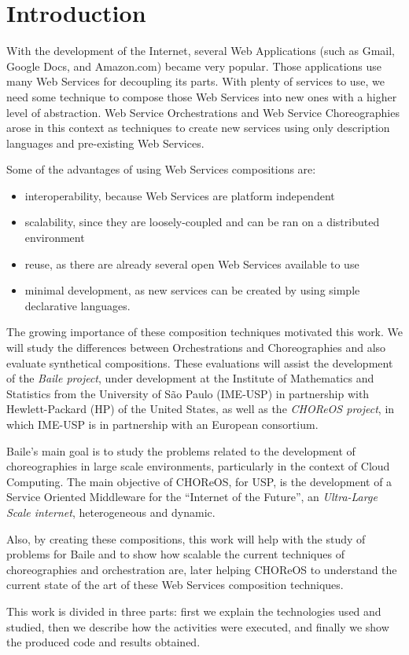\section{Introduction}

With the development of the Internet, several Web Applications (such as Gmail, Google Docs, and Amazon.com) became very popular. Those applications use many Web Services for decoupling its parts. With plenty of services to use, we need some technique to compose those Web Services into new ones with a higher level of abstraction. Web Service Orchestrations and Web Service Choreographies arose in this context as techniques to create new services using only description languages and pre-existing Web Services.

Some of the advantages of using Web Services compositions are:
\begin{itemize}
	\item interoperability, because Web Services are platform independent
	\item scalability, since they are loosely-coupled and can be ran on a distributed environment
	\item reuse, as there are already several open Web Services available to use
	\item minimal development, as new services can be created by using simple declarative languages.
\end{itemize}	

The growing importance of these composition techniques motivated this work. We will study the differences between Orchestrations and Choreographies and also evaluate synthetical compositions. These evaluations will assist the development of the \emph{Baile project}, under development at the Institute of Mathematics and Statistics from the University of São Paulo (IME-USP) in partnership with Hewlett-Packard (HP) of the United States, as well as the \emph{CHOReOS project}, in which IME-USP is in partnership with an European consortium.

Baile’s main goal is to study the problems related to the development of choreographies in large scale environments, particularly in the context of Cloud Computing. The main objective of CHOReOS, for USP, is the development of a Service Oriented Middleware for the ``Internet of the Future'', an \emph{Ultra-Large Scale internet}, heterogeneous and dynamic.

Also, by creating these compositions, this work will help with the study of problems for Baile and to show how scalable the current techniques of choreographies and orchestration are, later helping CHOReOS to understand the current state of the art of these Web Services composition techniques.

This work is divided in three parts: first we explain the technologies used and studied, then we describe how the activities were executed, and finally we show the produced code and results obtained.